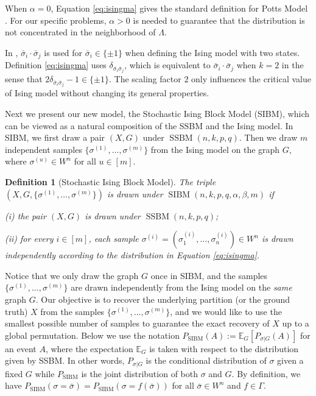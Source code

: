 \documentclass[conference]{IEEEtran}
\newtheorem{definition}{Definition}%
\DeclareMathOperator{\SSBM}{SSBM}
\DeclareMathOperator{\SIBM}{SIBM}
\begin{document}
When $\alpha=0$, Equation \eqref{eq:isingma} gives the standard definition for Potts Model \cite{potts1952some}.
For our specific problems, $\alpha > 0$ is needed to guarantee that the distribution is not concentrated in the neighborhood of $\Lambda$.

In \cite{ye2020exact}, $\bar{\sigma}_i \cdot \bar{\sigma}_j$ is used for $\bar{\sigma}_i \in \{\pm 1\}$ when defining the Ising model with two states.
Definition \ref{eq:isingma} uses  $\delta_{\bar{\sigma}_i\bar{\sigma}_j}$, which is equivalent to $\bar{\sigma}_i \cdot \bar{\sigma}_j$ when $k=2$ in the sense that $2\delta_{\bar{\sigma}_i\bar{\sigma}_j} - 1 \in \{\pm 1\}$. The scaling factor $2$ only influences the
critical value of Ising model without changing its general properties.

Next we present our new model, the Stochastic Ising Block Model (SIBM), which can be viewed as a natural composition of the SSBM and the Ising model. In SIBM, we first draw a pair $(X,G)$ under $\SSBM(n,k,p,q)$.  Then we draw $m$ independent samples $\{\sigma^{(1)},\dots,\sigma^{(m)}\}$ from the Ising model on the graph $G$, where $\sigma^{(u)}\in W^n$ for all $u\in[m]$.

\begin{definition}[Stochastic Ising Block Model]
The triple $(X,G,\{\sigma^{(1)},\dots,\sigma^{(m)}\})$ is drawn under $\SIBM(n,k, p,q,\alpha,\beta,m)$ if

\noindent
(i) the pair $(X,G)$ is drawn under $\SSBM(n,k, p,q)$;

\noindent
(ii) for every $i\in[m]$, each sample $\sigma^{(i)}=(\sigma_1^{(i)},\dots,\sigma_n^{(i)}) \in W^n$ is drawn independently according to the distribution in Equation \eqref{eq:isingma}.
\end{definition}

Notice that we only draw the graph $G$ once in SIBM, and the samples $\{\sigma^{(1)},\dots,\sigma^{(m)}\}$ are drawn independently from the Ising model on the {\em same} graph $G$.
Our objective is to recover the underlying partition (or the ground truth) $X$ from the samples $\{\sigma^{(1)},\dots,\sigma^{(m)}\}$, and we would like to use the smallest possible number of samples to guarantee the exact recovery of $X$ up to a global permutation.
Below we use the notation $P_{\SIBM}(A):=\mathbb{E}_G[P_{\sigma|G}(A)]$ for an event $A$, where the expectation $\mathbb{E}_G$ is taken with respect to the distribution given by SSBM. In other words, $P_{\sigma|G}$ is the conditional distribution of  $\sigma$ given a fixed $G$ while $P_{\SIBM}$ is the joint distribution of both $\sigma$ and $G$.
By definition, we have $P_{\SIBM}(\sigma=\bar{\sigma})=P_{\SIBM}(\sigma=f(\bar{\sigma}))$ for all $\bar{\sigma}\in W^n$ and $f\in \Gamma$.
\end{document}
